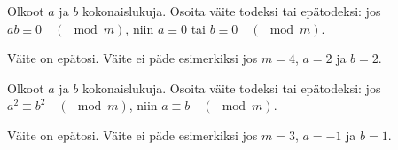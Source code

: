 \begin{kotitehtavasivu}
\begin{tehtava}
	Olkoot $a$ ja $b$ kokonaislukuja. Osoita väite todeksi tai epätodeksi: jos $ab \equiv 0 \quad (\mod m)$, niin $a \equiv 0$ tai $b\equiv 0 \quad (\mod m)$.
	
	\begin{vastaus}
		Väite on epätosi. Väite ei päde esimerkiksi jos $m = 4$, $a = 2$ ja $b = 2$.
	\end{vastaus}
\end{tehtava}

\begin{tehtava}
	Olkoot $a$ ja $b$ kokonaislukuja. Osoita väite todeksi tai epätodeksi: jos $a^2 \equiv b^2 \quad (\mod m)$, niin $a \equiv b \quad (\mod m)$.
	
	\begin{vastaus}
		Väite on epätosi. Väite ei päde esimerkiksi jos $m = 3$, $a = -1$ ja $b = 1$.
	\end{vastaus}
\end{tehtava}


\end{kotitehtavasivu}
